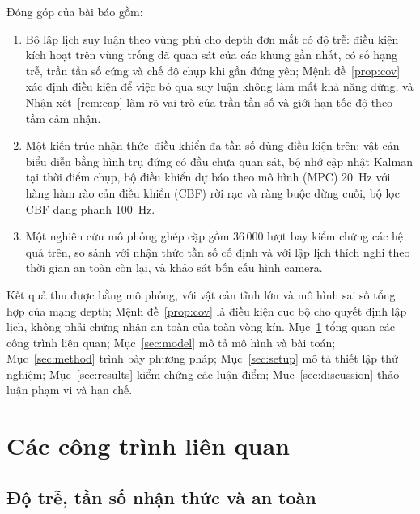 \documentclass[11pt,a4paper]{article}
\theoremstyle{plain}
\theoremstyle{definition}
\theoremstyle{remark}
\begin{document}
Đóng góp của bài báo gồm:
\begin{enumerate}
\item Bộ lập lịch suy luận theo vùng phủ cho depth đơn mắt có độ trễ: điều kiện kích hoạt trên vùng trống đã quan sát của các khung gần nhất, có số hạng trễ, trần tần số cứng và chế độ chụp khi gần đứng yên; Mệnh đề~\ref{prop:cov} xác định điều kiện để việc bỏ qua suy luận không làm mất khả năng dừng, và Nhận xét~\ref{rem:cap} làm rõ vai trò của trần tần số và giới hạn tốc độ theo tầm cảm nhận.
\item Một kiến trúc nhận thức--điều khiển đa tần số dùng điều kiện trên: vật cản biểu diễn bằng hình trụ đứng có đầu chưa quan sát, bộ nhớ cập nhật Kalman tại thời điểm chụp, bộ điều khiển dự báo theo mô hình (MPC) 20~Hz với hàng hàm rào cản điều khiển (CBF) rời rạc và ràng buộc dừng cuối, bộ lọc CBF dạng phanh 100~Hz.
\item Một nghiên cứu mô phỏng ghép cặp gồm 36\,000 lượt bay kiểm chứng các hệ quả trên, so sánh với nhận thức tần số cố định và với lập lịch thích nghi theo thời gian an toàn còn lại, và khảo sát bốn cấu hình camera.
\end{enumerate}

Kết quả thu được bằng mô phỏng, với vật cản tĩnh lớn và mô hình sai số tổng hợp của mạng depth; Mệnh đề~\ref{prop:cov} là điều kiện cục bộ cho quyết định lập lịch, không phải chứng nhận an toàn của toàn vòng kín. Mục~\ref{sec:related} tổng quan các công trình liên quan; Mục~\ref{sec:model} mô tả mô hình và bài toán; Mục~\ref{sec:method} trình bày phương pháp; Mục~\ref{sec:setup} mô tả thiết lập thử nghiệm; Mục~\ref{sec:results} kiểm chứng các luận điểm; Mục~\ref{sec:discussion} thảo luận phạm vi và hạn chế.

\section{Các công trình liên quan}\label{sec:related}

\subsection{Độ trễ, tần số nhận thức và an toàn}
\end{document}
